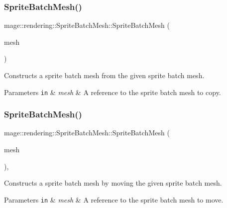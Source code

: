\subsubsection{\texorpdfstring{Sprite\+Batch\+Mesh()}{SpriteBatchMesh()}\hspace{0.1cm}{\footnotesize\ttfamily [2/3]}}
{\footnotesize\ttfamily mage\+::rendering\+::\+Sprite\+Batch\+Mesh\+::\+Sprite\+Batch\+Mesh (\begin{DoxyParamCaption}\item[{const \mbox{\hyperlink{classmage_1_1rendering_1_1_sprite_batch_mesh}{Sprite\+Batch\+Mesh}} \&}]{mesh }\end{DoxyParamCaption})\hspace{0.3cm}{\ttfamily [delete]}}

Constructs a sprite batch mesh from the given sprite batch mesh.


\begin{DoxyParams}[1]{Parameters}
\mbox{\tt in}  & {\em mesh} & A reference to the sprite batch mesh to copy. \\
\hline
\end{DoxyParams}
\mbox{\label{classmage_1_1rendering_1_1_sprite_batch_mesh_af36ff5857269d512b8d6799d1121599d}} 
\subsubsection{\texorpdfstring{Sprite\+Batch\+Mesh()}{SpriteBatchMesh()}\hspace{0.1cm}{\footnotesize\ttfamily [3/3]}}
{\footnotesize\ttfamily mage\+::rendering\+::\+Sprite\+Batch\+Mesh\+::\+Sprite\+Batch\+Mesh (\begin{DoxyParamCaption}\item[{\mbox{\hyperlink{classmage_1_1rendering_1_1_sprite_batch_mesh}{Sprite\+Batch\+Mesh}} \&\&}]{mesh }\end{DoxyParamCaption})\hspace{0.3cm}{\ttfamily [default]}, {\ttfamily [noexcept]}}

Constructs a sprite batch mesh by moving the given sprite batch mesh.


\begin{DoxyParams}[1]{Parameters}
\mbox{\tt in}  & {\em mesh} & A reference to the sprite batch mesh to move. \\
\hline
\end{DoxyParams}
\mbox{\label{classmage_1_1rendering_1_1_sprite_batch_mesh_a3228406dcd17c971ab84e2565c547d8c}} 
